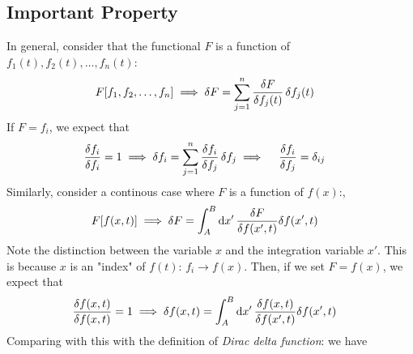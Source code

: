 \subsection{Important Property}
In general, consider that the functional $F$ is a function of $f_1(t), f_2(t), \ldots, f_n(t)$:
\begin{align}
  F[f_1, f_2, \ldots, f_n] \implies \fdif{F} & = \sum_{j=1}^{n} \fdv{F}{f_j(t)} \fdif{f_j(t)}
\end{align}
If $F = f_i$, we expect that
\begin{align}
  \fdv{f_i}{f_i} & = 1 \implies \fdif{f_i} = \sum_{j=1}^{n} \fdv{f_i}{f_j} \fdif{f_j}
  \implies \quad \fdv{f_i}{f_j} = \delta_{ij} \label{eq:func_deriv_kronecker_delta}
\end{align}
Similarly, consider a continous case where $F$ is a function of $f(x)$:,
\begin{align}
  F[f(x,t)] \implies \fdif{F} & = \int_A^B \odif{x'} \, \fdv{F}{f(x',t)} \delta{f(x',t)}
\end{align}
Note the distinction between the variable $x$ and the integration variable $x'$. This is because $x$ is an "index" of $f(t)$: $f_i \to f(x)$.
Then, if we set $F = f(x)$, we expect that
\begin{align}
  \fdv{f(x, t)}{f(x, t)} & = 1 \implies \delta{f(x, t)} = \int_A^B \odif{x'} \, \fdv{f(x,t)}{f(x',t)} \delta{f(x',t)}
\end{align}
Comparing with this with the definition of \emph{Dirac delta function}:
we have

